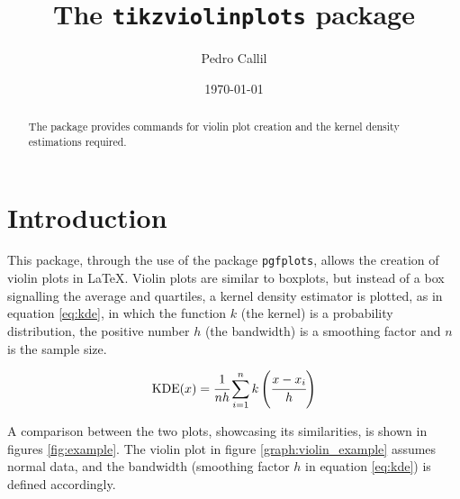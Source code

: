 \documentclass{article}
\title{The \texttt{tikzviolinplots} package}
\author{Pedro Callil}
\date{\today}
\begin{document}
\maketitle

\tableofcontents

\begin{abstract}
	The package provides commands for violin plot creation and
	the kernel density estimations required.
\end{abstract}

\section{Introduction}

This package, through the use of the package \texttt{pgfplots}, allows the
creation of violin plots in \LaTeX. Violin plots are similar to boxplots,
but instead of a box signalling the average and quartiles, a kernel density
estimator is plotted, as in equation \ref{eq:kde}, in which the function $k$
(the kernel) is a probability distribution, the positive number $h$ (the
bandwidth) is a smoothing factor and $n$ is the sample size.

\begin{equation}
	\label{eq:kde}
	\textnormal{KDE}(x) = %
	\cfrac{1}{nh}\sum_{i=1}^nk\left(\cfrac{x-x_i}{h}\right)
\end{equation}

A comparison between the two plots, showcasing its similarities, is
shown in figures \ref{fig:example}. The violin plot in figure
\ref{graph:violin_example} assumes normal data, and the bandwidth
(smoothing factor $h$ in equation \ref{eq:kde}) is defined accordingly.
\end{document}
